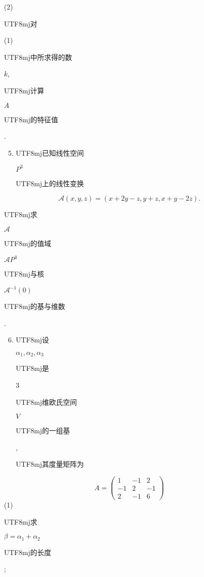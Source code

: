\documentclass[10pt]{article}
\begin{document}
(2) \begin{CJK}{UTF8}{mj}对\end{CJK} (1) \begin{CJK}{UTF8}{mj}中所求得的数\end{CJK} $k$, \begin{CJK}{UTF8}{mj}计算\end{CJK} $A$ \begin{CJK}{UTF8}{mj}的特征值\end{CJK}.

\begin{enumerate}
  \setcounter{enumi}{4}
  \item \begin{CJK}{UTF8}{mj}已知线性空间\end{CJK} $P^{3}$ \begin{CJK}{UTF8}{mj}上的线性变换\end{CJK}
\end{enumerate}
$$
\mathscr{A}(x, y, z)=(x+2 y-z, y+z, x+y-2 z) .
$$
\begin{CJK}{UTF8}{mj}求\end{CJK} $\mathscr{A}$ \begin{CJK}{UTF8}{mj}的值域\end{CJK} $\mathscr{A} P^{3}$ \begin{CJK}{UTF8}{mj}与核\end{CJK} $\mathscr{A}^{-1}(0)$ \begin{CJK}{UTF8}{mj}的基与维数\end{CJK}.

\begin{enumerate}
  \setcounter{enumi}{5}
  \item \begin{CJK}{UTF8}{mj}设\end{CJK} $\alpha_{1}, \alpha_{2}, \alpha_{3}$ \begin{CJK}{UTF8}{mj}是\end{CJK} 3 \begin{CJK}{UTF8}{mj}维欧氏空间\end{CJK} $V$ \begin{CJK}{UTF8}{mj}的一组基\end{CJK}, \begin{CJK}{UTF8}{mj}其度量矩阵为\end{CJK}
\end{enumerate}
$$
A=\left(\begin{array}{ccc}
1 & -1 & 2 \\
-1 & 2 & -1 \\
2 & -1 & 6
\end{array}\right)
$$
(1) \begin{CJK}{UTF8}{mj}求\end{CJK} $\beta=\alpha_{1}+\alpha_{2}$ \begin{CJK}{UTF8}{mj}的长度\end{CJK};
\end{document}
